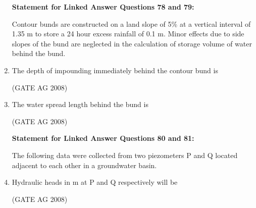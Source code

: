 \documentclass[journal]{IEEEtran}
\begin{document}
\begin{enumerate}
\medskip


\textbf{Statement for Linked Answer Questions 78 and 79:}

Contour bunds are constructed on a land slope of 5\% at a vertical interval of 1.35 m to store a 24 hour excess rainfall of 0.1 m. Minor effects due to side slopes of the bund are neglected in the calculation of storage volume of water behind the bund.

\item 
 The depth of impounding immediately behind the contour bund is
\begin{enumerate}
\end{enumerate}
\hfill(GATE AG 2008)\\

\medskip

\item 
 The water spread length behind the bund is
\begin{enumerate}
\end{enumerate}
\hfill(GATE AG 2008)\\

\medskip


\textbf{Statement for Linked Answer Questions 80 and 81:}

The following data were collected from two piezometers P and Q located adjacent to each other in a groundwater basin.



\item 
 Hydraulic heads in m at P and Q respectively will be
\begin{enumerate}
\end{enumerate}
\hfill(GATE AG 2008)\\


\end{enumerate}
\end{document}
